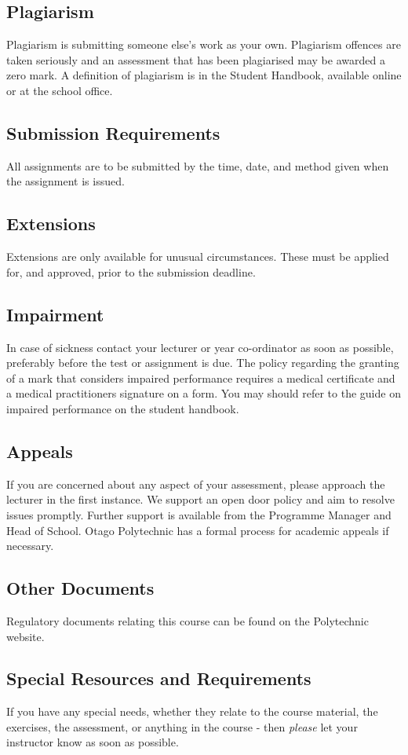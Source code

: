 \documentclass{article}
\begin{document}
\subsection*{Plagiarism}
Plagiarism is submitting someone else's work as your own.  Plagiarism offences are taken seriously and an
assessment that has been plagiarised may be awarded a zero mark.  A definition of plagiarism is in the Student Handbook,
available online or at the school office.

\subsection*{Submission Requirements}
All assignments are to be submitted by the time, date, and method given when the assignment is issued.

\subsection*{Extensions}
Extensions are only available for unusual circumstances.  These must be applied for, and approved, prior to the submission deadline.

\subsection*{Impairment}
In case of sickness contact your lecturer or year co-ordinator as soon as possible, preferably before the test or
assignment is due.  The policy regarding the granting of a mark that considers impaired performance requires a medical
certificate and a medical practitioners signature on a form. You may should refer to the guide on impaired performance
on the student handbook.

\subsection*{Appeals}
If you are concerned about any aspect of your assessment, please approach the lecturer in the first instance.  We support
an open door policy and aim to resolve issues promptly.  Further support is available from the Programme
Manager and Head of School. Otago Polytechnic has a formal process for academic appeals if necessary.

\subsection*{Other Documents}
Regulatory documents relating this course can be found on the Polytechnic website.

\subsection*{Special Resources and Requirements}
If you have any special needs, whether they relate to the course material, the exercises, the assessment, or anything in the course -
then \emph{please} let your instructor know as soon as possible.
\end{document}
